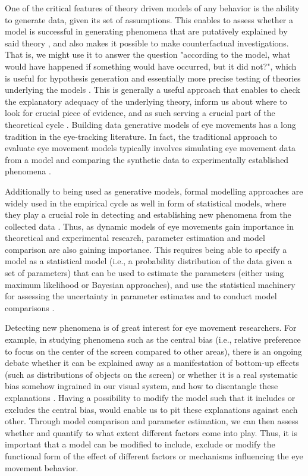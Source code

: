 \documentclass{article}
\begin{document}
One of the critical features of theory driven models of any behavior is the ability to generate data, given its set of assumptions. This enables to assess whether a model is successful in generating phenomena that are putatively explained by said theory \citep{borsboom2020theory,robinaugh2020invisible}, and also makes it possible to make counterfactual investigations. That is, we might use it to answer the question "according to the model, what would have happened if something would have occurred, but it did not?", which is useful for hypothesis generation and essentially more precise testing of theories underlying the models \citep[e.g.,][]{nuthmann2010crisp}. This is generally a useful approach that enables to check the explanatory adequacy of the underlying theory, inform us about where to look for crucial piece of evidence, and as such serving a crucial part of the theoretical cycle \citep{borsboom2020theory}. Building data generative models of eye movements has a long tradition in the eye-tracking literature. In fact, the traditional approach to evaluate eye movement models typically involves simulating eye movement data from a model and comparing the synthetic data to experimentally established phenomena \citep{schutt2017likelihood}.

Additionally to being used as generative models, formal modelling approaches are widely used in the empirical cycle as well in form of statistical models, where they play a crucial role in detecting and establishing new phenomena from the collected data \citep{wagenmakers2018creativity}. Thus, as dynamic models of eye movements gain importance in theoretical and experimental research, parameter estimation and model comparison are also gaining importance. This requires being able to specify a model as a statistical model (i.e., a probability distribution of the data given a set of parameters) that can be used to estimate the parameters (either using maximum likelihood or Bayesian approaches), and use the statistical machinery for assessing the uncertainty in parameter estimates and to conduct model comparisons \citep[e.g.,][]{schutt2017likelihood,malem2020exploration}.

Detecting new phenomena is of great interest for eye movement researchers. For example, in studying phenomena such as the central bias (i.e., relative preference to focus on the center of the screen compared to other areas), there is an ongoing debate whether it can be explained away as a manifestation of bottom-up effects (such as distributions of objects on the screen) or whether it is a real systematic bias somehow ingrained in our visual system, and how to disentangle these explanations \citep{tatler2007central,renswoude2019central,tseng2009quantifying}. Having a possibility to modify the model such that it includes or excludes the central bias, would enable us to pit these explanations against each other. Through model comparison and parameter estimation, we can then assess whether and quantify to what extent different factors come into play. Thus, it is important that a model can be modified to include, exclude or modify the functional form of the effect of different factors or mechanisms influencing the eye movement behavior.
\end{document}
